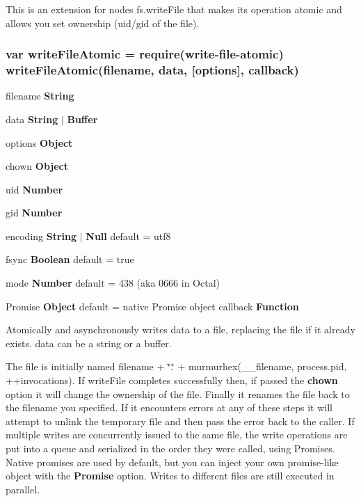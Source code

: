 This is an extension for node\textquotesingle{}s {\ttfamily fs.\+write\+File} that makes its operation atomic and allows you set ownership (uid/gid of the file).

\subsubsection*{var write\+File\+Atomic = require(\textquotesingle{}write-\/file-\/atomic\textquotesingle{})~\newline
write\+File\+Atomic(filename, data, \mbox{[}options\mbox{]}, callback)}


\begin{DoxyItemize}
\item filename {\bfseries String}
\item data {\bfseries String} $\vert$ {\bfseries Buffer}
\item options {\bfseries Object}
\begin{DoxyItemize}
\item chown {\bfseries Object}
\begin{DoxyItemize}
\item uid {\bfseries Number}
\item gid {\bfseries Number}
\end{DoxyItemize}
\item encoding {\bfseries String} $\vert$ {\bfseries Null} default = \textquotesingle{}utf8\textquotesingle{}
\item fsync {\bfseries Boolean} default = true
\item mode {\bfseries Number} default = 438 (aka 0666 in Octal)
\item Promise {\bfseries Object} default = native Promise object callback {\bfseries Function}
\end{DoxyItemize}
\end{DoxyItemize}

Atomically and asynchronously writes data to a file, replacing the file if it already exists. data can be a string or a buffer.

The file is initially named {\ttfamily filename + \char`\"{}.\char`\"{} + murmurhex(\+\_\+\+\_\+filename, process.\+pid, ++invocations)}. If write\+File completes successfully then, if passed the {\bfseries chown} option it will change the ownership of the file. Finally it renames the file back to the filename you specified. If it encounters errors at any of these steps it will attempt to unlink the temporary file and then pass the error back to the caller. If multiple writes are concurrently issued to the same file, the write operations are put into a queue and serialized in the order they were called, using Promises. Native promises are used by default, but you can inject your own promise-\/like object with the {\bfseries Promise} option. Writes to different files are still executed in parallel.

